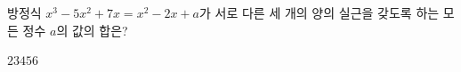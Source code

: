 방정식 $x^3-5x^2+7x=x^2-2x+a$가 서로 다른 세 개의 양의 실근을 갖도록 하는 모든 정수 $a$의 값의 합은?
\begin{choices32}{$2$}{$3$}{$4$}{$5$}{$6$}\end{choices32}
